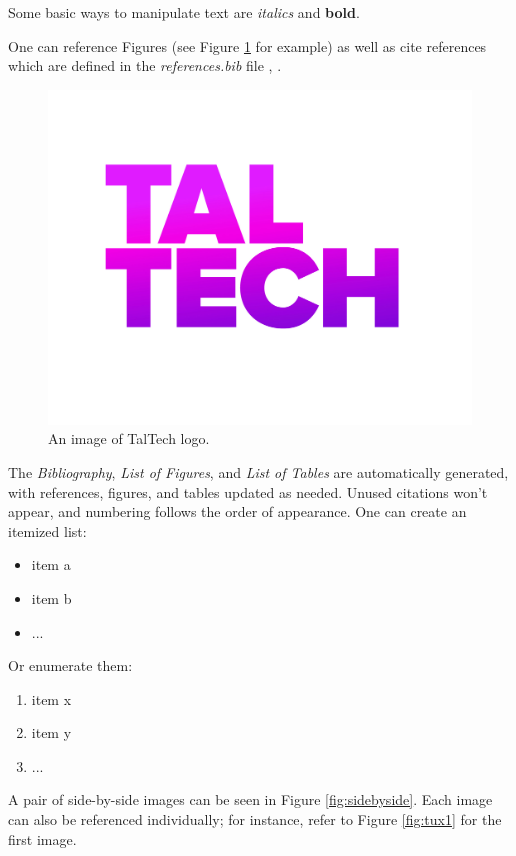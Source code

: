Some basic ways to manipulate text are \textit{italics} and \textbf{bold}. 

One can reference Figures (see Figure \ref{fig:taltech} for example) as well as cite references which are defined in the \textit{references.bib} file \cite{spectre}, \cite{example-reference} .

\begin{figure}[hb] %
    \centering
    \includegraphics[width=.3\textwidth]{figures/taltech.jpg} %
    \caption{An image of TalTech logo.} %
    \label{fig:taltech} %
\end{figure}

The \textit{Bibliography}, \textit{List of Figures}, and \textit{List of Tables} are automatically generated, with references, figures, and tables updated as needed. Unused citations won't appear, and numbering follows the order of appearance.
One can create an itemized list:
\begin{itemize}  %
    \item item a  %
    \item item b  %
    \item ...
\end{itemize}

Or enumerate them:
\begin{enumerate} %
    \item item x  %
    \item item y
    \item ...
\end{enumerate}


A pair of side-by-side images can be seen in Figure \ref{fig:sidebyside}. Each image can also be referenced individually; for instance, refer to Figure \ref{fig:tux1} for the first image.

